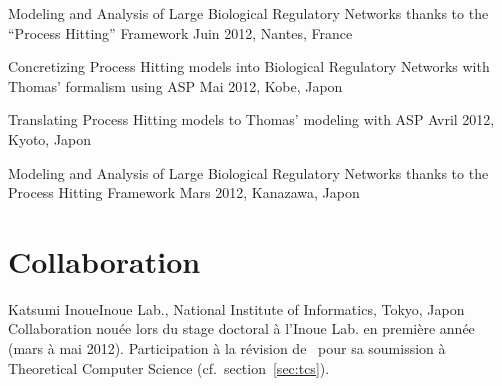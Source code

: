 {Modeling and Analysis of Large Biological Regulatory Networks thanks to the “Process Hitting” Framework}
{Juin 2012, Nantes, France}

{Concretizing Process Hitting models into Biological Regulatory Networks with Thomas' formalism using ASP}
{Mai 2012, Kobe, Japon}

{Translating Process Hitting models to Thomas' modeling with ASP}
{Avril 2012, Kyoto, Japon}

{Modeling and Analysis of Large Biological Regulatory Networks thanks to the Process Hitting Framework}
{Mars 2012, Kanazawa, Japon}



\section{Collaboration}

\entree
{Katsumi Inoue}{Inoue Lab., National Institute of Informatics, Tokyo, Japon}
{Collaboration nouée lors du stage doctoral à l'Inoue Lab. en première année (mars à mai 2012).
Participation à la révision de~\cite{FPIMR12-CMSB} pour sa soumission à Theoretical Computer Science (cf.~section~\ref{sec:tcs}).}
